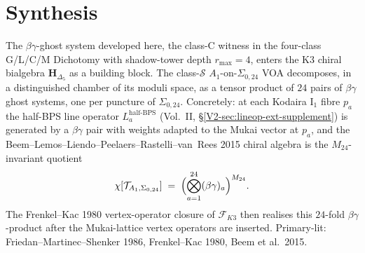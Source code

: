 \section{Synthesis}
\label{sec:bg-supplement}

\begin{remark}
\label{rem:bg-1}
The $\beta\gamma$-ghost system developed here, the class-C witness in
the four-class G/L/C/M Dichotomy with shadow-tower depth $r_{\max} = 4$,
enters the K3 chiral bialgebra $\mathbf H_{\Delta_5}$ as a building block. The class-$\mathcal S$
$A_1$-on-$\Sigma_{0,24}$ VOA decomposes, in a distinguished chamber of
its moduli space, as a tensor product of $24$ pairs of $\beta\gamma$
ghost systems, one per puncture of $\Sigma_{0,24}$. Concretely: at each
Kodaira I$_1$ fibre $p_a$ the half-BPS line operator $L_a^{\mathrm{half\text{-}BPS}}$
(Vol.~II, \S\ref{V2-sec:lineop-ext-supplement}) is generated by a
$\beta\gamma$ pair with weights adapted to the Mukai vector at $p_a$,
and the Beem--Lemos--Liendo--Peelaers--Rastelli--van~Rees 2015 chiral
algebra is the $M_{24}$-invariant quotient
\[
\chi[\mathcal T_{A_1,\Sigma_{0,24}}] \;=\; \Bigl(\bigotimes_{a=1}^{24} (\beta\gamma)_a\Bigr)^{M_{24}}.
\]
The Frenkel--Kac 1980 vertex-operator closure of $\mathcal F_{K3}$ then
realises this $24$-fold $\beta\gamma$-product after the Mukai-lattice
vertex operators are inserted. Primary-lit: Friedan--Martinec--Shenker
1986, Frenkel--Kac 1980, Beem et al.\ 2015.
\end{remark}
